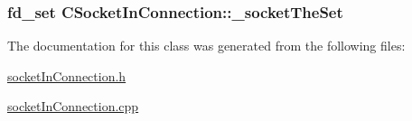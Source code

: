 \subsubsection[{\texorpdfstring{\+\_\+socket\+The\+Set}{_socketTheSet}}]{\setlength{\rightskip}{0pt plus 5cm}fd\+\_\+set C\+Socket\+In\+Connection\+::\+\_\+socket\+The\+Set\hspace{0.3cm}{\ttfamily [protected]}}\hypertarget{classCSocketInConnection_a0d6c6fbb3215d3ba3332fca268802d44}{}\label{classCSocketInConnection_a0d6c6fbb3215d3ba3332fca268802d44}


The documentation for this class was generated from the following files\+:\begin{DoxyCompactItemize}
\item 
\hyperlink{socketInConnection_8h}{socket\+In\+Connection.\+h}\item 
\hyperlink{socketInConnection_8cpp}{socket\+In\+Connection.\+cpp}\end{DoxyCompactItemize}
